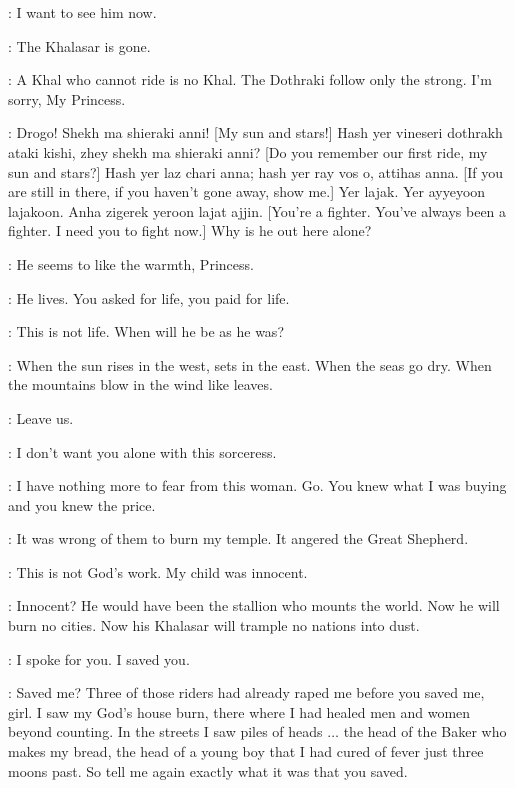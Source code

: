 \DAENERYS: I want to see him now. 


\DAENERYS: The Khalasar is gone. 

\JORAH: A Khal who cannot ride is no Khal. The Dothraki follow only the strong. I'm sorry, My Princess. 

\DAENERYS: Drogo! Shekh ma shieraki anni! [My sun and stars!] Hash yer vineseri dothrakh ataki kishi, zhey shekh ma shieraki anni? [Do you remember our first ride, my sun and stars?] Hash yer laz chari anna; hash yer ray vos o, attihas anna. [If you are still in there, if you haven't gone away, show me.] Yer lajak. Yer ayyeyoon lajakoon. Anha zigerek yeroon lajat ajjin. [You're a fighter. You've always been a fighter. I need you to fight now.] Why is he out here alone? 

\JORAH: He seems to like the warmth, Princess. 

\MIRRI: He lives. You asked for life, you paid for life. 

\DAENERYS: This is not life. When will he be as he was? 

\MIRRI: When the sun rises in the west, sets in the east.  When the seas go dry. When the mountains blow in the wind like leaves. 

\DAENERYS:  Leave us. 

\JORAH: I don't want you alone with this sorceress. 

\DAENERYS: I have nothing more to fear from this woman. Go. You knew what I was buying and you knew the price. 

\MIRRI: It was wrong of them to burn my temple. It angered the Great Shepherd. 

\DAENERYS: This is not God's work. My child was innocent. 

\MIRRI: Innocent? He would have been the stallion who mounts the world. Now he will burn no cities. Now his Khalasar will trample no nations into dust. 

\DAENERYS: I spoke for you. I saved you. 

\MIRRI: Saved me? Three of those riders had already raped me before you saved me, girl. I saw my God's house burn, there where I had healed men and women beyond counting. In the streets I saw piles of heads $\ldots$ the head of the Baker who makes my bread, the head of a young boy that I had cured of fever just three moons past. So tell me again exactly what it was that you saved. 

